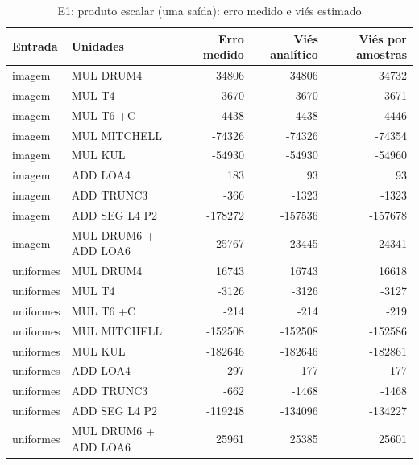 \begin{table}[htbp]
\centering
\caption{E1: produto escalar (uma saída): erro medido e viés estimado}
\begin{tabular}{|l|l|r|r|r|}
\hline
\rowcolor{tabAzul}\color{white}Entrada & \color{white}Unidades & \color{white}Erro medido & \color{white}Viés analítico & \color{white}Viés por amostras \\
\hline
imagem & MUL DRUM4 & 34806 & 34806 & 34732 \\ \hline
imagem & MUL T4 & -3670 & -3670 & -3671 \\ \hline
imagem & MUL T6 +C & -4438 & -4438 & -4446 \\ \hline
imagem & MUL MITCHELL & -74326 & -74326 & -74354 \\ \hline
imagem & MUL KUL & -54930 & -54930 & -54960 \\ \hline
imagem & ADD LOA4 & 183 & 93 & 93 \\ \hline
imagem & ADD TRUNC3 & -366 & -1323 & -1323 \\ \hline
imagem & ADD SEG L4 P2 & -178272 & -157536 & -157678 \\ \hline
imagem & MUL DRUM6 + ADD LOA6 & 25767 & 23445 & 24341 \\ \hline
uniformes & MUL DRUM4 & 16743 & 16743 & 16618 \\ \hline
uniformes & MUL T4 & -3126 & -3126 & -3127 \\ \hline
uniformes & MUL T6 +C & -214 & -214 & -219 \\ \hline
uniformes & MUL MITCHELL & -152508 & -152508 & -152586 \\ \hline
uniformes & MUL KUL & -182646 & -182646 & -182861 \\ \hline
uniformes & ADD LOA4 & 297 & 177 & 177 \\ \hline
uniformes & ADD TRUNC3 & -662 & -1468 & -1468 \\ \hline
uniformes & ADD SEG L4 P2 & -119248 & -134096 & -134227 \\ \hline
uniformes & MUL DRUM6 + ADD LOA6 & 25961 & 25385 & 25601 \\ \hline
\end{tabular}
\end{table}

